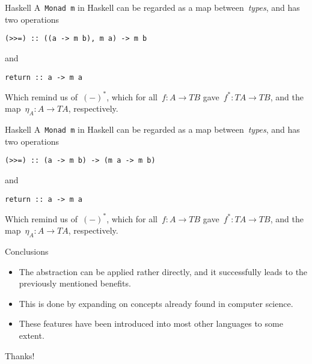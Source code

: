 \documentclass[notes]{beamer}
\begin{document}
\begin{frame}[fragile]{Haskell}
    A~\texttt{Monad m} in Haskell can be regarded as a map
    between~\emph{types}, and has two operations
    \begin{verbatim}
(>>=) :: ((a -> m b), m a) -> m b
    \end{verbatim}
    and
    \begin{verbatim}
return :: a -> m a
    \end{verbatim}

    Which remind us of~\((-)^{\ast}\), which for all~\(f:A\longrightarrow TB\)
    gave~\(f^{\ast}:TA\longrightarrow TB\), and the
    map~\(\eta_{A}:A\longrightarrow TA\), respectively.
\end{frame}

\begin{frame}[fragile]{Haskell}
    A~\texttt{Monad m} in Haskell can be regarded as a map
    between~\emph{types}, and has two operations
    \begin{verbatim}
(>>=) :: (a -> m b) -> (m a -> m b)
    \end{verbatim}
    and
    \begin{verbatim}
return :: a -> m a
    \end{verbatim}

    Which remind us of~\((-)^{\ast}\), which for all~\(f:A\longrightarrow TB\)
    gave~\(f^{\ast}:TA\longrightarrow TB\), and the
    map~\(\eta_{A}:A\longrightarrow TA\), respectively.
\end{frame}

\begin{frame}{Conclusions}
    \begin{itemize}
        \item The abstraction can be applied rather directly, and it
            successfully leads to the previously mentioned benefits.

            \pause

        \item This is done by expanding on concepts already found in computer
            science.

            \pause

        \item These features have been introduced into most other languages to
            some extent.
    \end{itemize}
\end{frame}

\begin{frame}
    \begin{center}
        \Huge Thanks!
    \end{center}
\end{frame}
\end{document}
